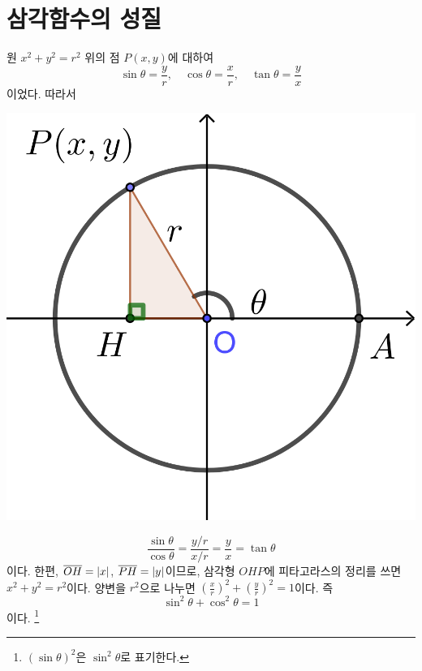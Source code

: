 \documentclass{oblivoir}
\begin{document}
\section{삼각함수의 성질}
\noindent\begin{minipage}{.7\textwidth}
원 \(x^2+y^2=r^2\) 위의 점 \(P(x,y)\)에 대하여
\[\sin\theta=\frac yr,\quad\cos\theta=\frac xr,\quad\tan\theta=\frac yx\]
이었다.
따라서
\end{minipage}
\begin{minipage}{.3\textwidth}
\centering
\vspace{10pt}
\includegraphics[width=\textwidth]{property_1}
\vspace{10pt}
\end{minipage}
\[\frac{\sin\theta}{\cos\theta}=\frac{y/r}{x/r}=\frac yx=\tan\theta\]
이다.
한편, \(\overline{OH}=|x|\), \(\overline{PH}=|y|\)이므로, 삼각형 \(OHP\)에 피타고라스의 정리를 쓰면 
\(x^2+y^2=r^2\)이다.
양변을 \(r^2\)으로 나누면 \((\frac xr)^2+(\frac yr)^2=1\)이다.
즉
\[\sin^2\theta+\cos^2\theta=1\]
이다.%
\footnote{\((\sin\theta)^2\)은 \(\sin^2\theta\)로 표기한다.}
\end{document}
